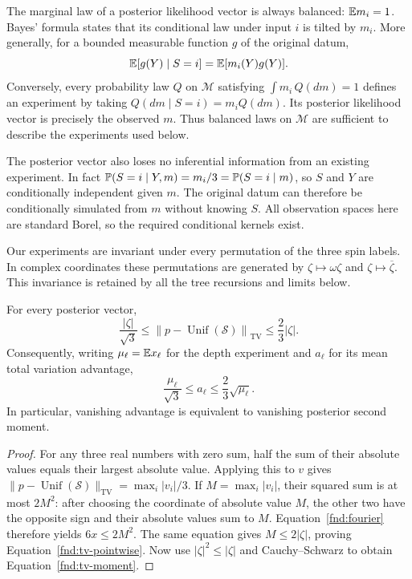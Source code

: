 The marginal law of a posterior likelihood vector is always balanced:
\(\mathbb E m_i=1\).  Bayes' formula states that its conditional law under
input \(i\) is tilted by \(m_i\).  More generally, for a bounded
measurable function \(g\) of the original datum,
\begin{equation}\label{fnd:bayes-tilt}
 \mathbb E[g(Y)\mid S=i]=\mathbb E[m_i(Y)g(Y)].
\end{equation}
Conversely, every probability law \(Q\) on \(\mathcal M\) satisfying
\(\int m_i\,Q(dm)=1\) defines an experiment by taking
\(Q(dm\mid S=i)=m_iQ(dm)\).  Its posterior likelihood vector is
precisely the observed \(m\).  Thus balanced laws on \(\mathcal M\)
are sufficient to describe the experiments used below.

The posterior vector also loses no inferential information from an
existing experiment.  In fact
\(\mathbb P(S=i\mid Y,m)=m_i/3=\mathbb P(S=i\mid m)\), so \(S\) and \(Y\)
are conditionally independent given \(m\).  The original datum can
therefore be conditionally simulated from \(m\) without knowing \(S\).
All observation spaces here are standard Borel, so the required
conditional kernels exist.

Our experiments are invariant under every permutation of the three spin
labels.  In complex coordinates these permutations are generated by
\(\zeta\mapsto\omega\zeta\) and
\(\zeta\mapsto\overline{\zeta}\).  This invariance is retained by
all the tree recursions and limits below.

\begin{lemma}
\label{fnd:norms}
For every posterior vector,
\begin{equation}\label{fnd:tv-pointwise}
 \frac{|\zeta|}{\sqrt3}
 \leq\left\|p-\operatorname{Unif}(\mathcal S)\right\|_{\mathrm{TV}}
 \leq\frac23|\zeta|.
\end{equation}
Consequently, writing \(\mu_\ell=\mathbb E x_\ell\) for the depth experiment
and \(a_\ell\) for its mean total variation advantage,
\begin{equation}\label{fnd:tv-moment}
 \frac{\mu_\ell}{\sqrt3}\leq a_\ell
 \leq\frac23\sqrt{\mu_\ell}.
\end{equation}
In particular, vanishing advantage is equivalent to vanishing posterior
second moment.
\end{lemma}

\begin{proof}
For any three real numbers with zero sum, half the sum of their absolute
values equals their largest absolute value.  Applying this to \(v\)
gives \(\|p-\operatorname{Unif}(\mathcal S)\|_{\mathrm{TV}}
=\max_i|v_i|/3\).  If \(M=\max_i|v_i|\), their squared sum is at
most \(2M^2\): after choosing the coordinate of absolute value \(M\),
the other two have the opposite sign and their absolute values sum to
\(M\).  Equation~\eqref{fnd:fourier} therefore yields
\(6x\leq2M^2\).  The same equation gives
\(M\leq2|\zeta|\), proving Equation~\eqref{fnd:tv-pointwise}.
Now use \(|\zeta|^2\leq|\zeta|\) and Cauchy--Schwarz to obtain
Equation~\eqref{fnd:tv-moment}.
\end{proof}

